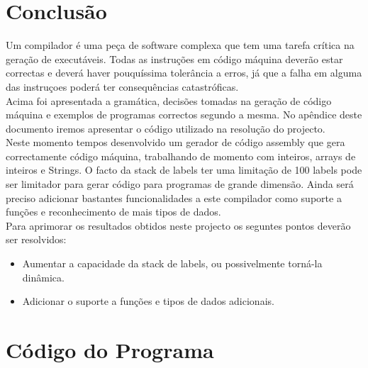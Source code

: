 \documentclass{report}
\begin{document}
\chapter{Conclusão} \label {conc}
Um compilador é uma peça de software complexa que tem uma tarefa crítica na geração de executáveis. Todas as instruções em código máquina deverão estar correctas e deverá haver pouquíssima tolerância a erros, já que a falha em alguma das instruçoes poderá ter consequências catastróficas.\\Acima foi apresentada a gramática, decisões tomadas na geração de código máquina e exemplos de programas correctos segundo a mesma. No apêndice deste documento iremos apresentar o código utilizado na resolução do projecto.\\
Neste momento tempos desenvolvido um gerador de código assembly que gera correctamente código máquina, trabalhando de momento com inteiros, arrays de inteiros e Strings. O facto da stack de labels ter uma limitação de 100 labels pode ser limitador para gerar código para programas de grande dimensão. Ainda será preciso adicionar bastantes funcionalidades a este compilador como suporte a funções e reconhecimento de mais tipos de dados.\\
Para aprimorar os resultados obtidos neste projecto os seguntes pontos deverão ser resolvidos:\\
\begin{itemize}
	\item Aumentar a capacidade da stack de labels, ou possivelmente torná-la dinâmica.
	\item Adicionar o suporte a funções e tipos de dados adicionais.
\end{itemize}

\appendix
\chapter{Código do Programa}
\end{document}
